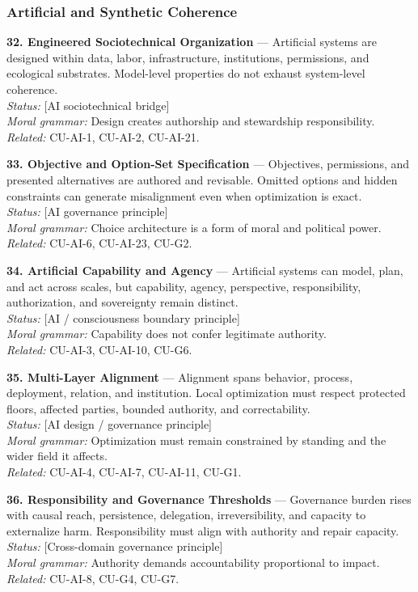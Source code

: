 \documentclass[
  11pt,
]{article}
\begin{document}
\subsubsection{Artificial and Synthetic
Coherence}\label{artificial-and-synthetic-coherence}

\textbf{32. Engineered Sociotechnical Organization} --- Artificial
systems are designed within data, labor, infrastructure, institutions,
permissions, and ecological substrates. Model-level properties do not
exhaust system-level coherence.\\
\emph{Status:} {[}AI sociotechnical bridge{]}\\
\emph{Moral grammar:} Design creates authorship and stewardship
responsibility.\\
\emph{Related:} CU-AI-1, CU-AI-2, CU-AI-21.

\textbf{33. Objective and Option-Set Specification} --- Objectives,
permissions, and presented alternatives are authored and revisable.
Omitted options and hidden constraints can generate misalignment even
when optimization is exact.\\
\emph{Status:} {[}AI governance principle{]}\\
\emph{Moral grammar:} Choice architecture is a form of moral and
political power.\\
\emph{Related:} CU-AI-6, CU-AI-23, CU-G2.

\textbf{34. Artificial Capability and Agency} --- Artificial systems can
model, plan, and act across scales, but capability, agency, perspective,
responsibility, authorization, and sovereignty remain distinct.\\
\emph{Status:} {[}AI / consciousness boundary principle{]}\\
\emph{Moral grammar:} Capability does not confer legitimate authority.\\
\emph{Related:} CU-AI-3, CU-AI-10, CU-G6.

\textbf{35. Multi-Layer Alignment} --- Alignment spans behavior,
process, deployment, relation, and institution. Local optimization must
respect protected floors, affected parties, bounded authority, and
correctability.\\
\emph{Status:} {[}AI design / governance principle{]}\\
\emph{Moral grammar:} Optimization must remain constrained by standing
and the wider field it affects.\\
\emph{Related:} CU-AI-4, CU-AI-7, CU-AI-11, CU-G1.

\textbf{36. Responsibility and Governance Thresholds} --- Governance
burden rises with causal reach, persistence, delegation,
irreversibility, and capacity to externalize harm. Responsibility must
align with authority and repair capacity.\\
\emph{Status:} {[}Cross-domain governance principle{]}\\
\emph{Moral grammar:} Authority demands accountability proportional to
impact.\\
\emph{Related:} CU-AI-8, CU-G4, CU-G7.
\end{document}
